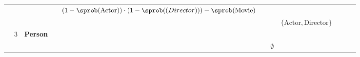 \begin{table}[]
\begin{tabular}{lllllllllll}
                          &                           &                   &                                                               & \cellcolor[HTML]{FC8D59}$(1 - \sprob(\text{Actor})) \cdot (1 - \sprob(\text(Director))) - \sprob(\text{Movie})$ &                           &                                                             &                                                                            &                                                                                          &                                        &                                                                                                                 \\
                          &                           &                   &                                                               &                                                                                                                 &                           &                                                             & \cellcolor[HTML]{FC8D59}$\{\text{Actor}, \text{Director}\}$                &                                                                                          &                                        &                                                                                                                 \\
                          & \cellcolor[HTML]{FC8D59}3 & \textbf{Person}   &                                                               &                                                                                                                 &                           &                                                             &                                                                            &                                                                                          &                                        &                                                                                                                 \\
                          &                           &                   &                                                               &                                                                                                                 &                           & \cellcolor[HTML]{FC8D59}$\emptyset$                         &                                                                            &                                                                                          &                                        &                                                                                                                 \\

\end{tabular}
\end{table}
